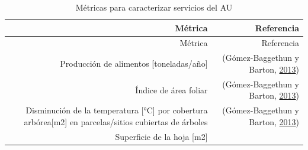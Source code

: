 \documentclass[12pt,a4paper,openany]{book}
\theoremstyle{definition}
\theoremstyle{definition}
\theoremstyle{definition}
\theoremstyle{remark}
\begin{document}
\begin{longtable}[]{@{}rr@{}}
\caption{\label{tab:ind-AU} Métricas para caracterizar servicios del
AU}\tabularnewline
\toprule
\begin{minipage}[b]{0.57\columnwidth}\raggedleft\strut
Métrica\strut
\end{minipage} & \begin{minipage}[b]{0.31\columnwidth}\raggedleft\strut
Referencia\strut
\end{minipage}\tabularnewline
\midrule
\endfirsthead
\toprule
\begin{minipage}[b]{0.57\columnwidth}\raggedleft\strut
Métrica\strut
\end{minipage} & \begin{minipage}[b]{0.31\columnwidth}\raggedleft\strut
Referencia\strut
\end{minipage}\tabularnewline
\midrule
\endhead
\begin{minipage}[t]{0.57\columnwidth}\raggedleft\strut
Producción de alimentos {[}toneladas/año{]}\strut
\end{minipage} & \begin{minipage}[t]{0.31\columnwidth}\raggedleft\strut
(Gómez-Baggethun y Barton,
\protect\hyperlink{ref-gomez-baggethun_classifying_2013}{2013})\strut
\end{minipage}\tabularnewline
\begin{minipage}[t]{0.57\columnwidth}\raggedleft\strut
Índice de área foliar\strut
\end{minipage} & \begin{minipage}[t]{0.31\columnwidth}\raggedleft\strut
(Gómez-Baggethun y Barton,
\protect\hyperlink{ref-gomez-baggethun_classifying_2013}{2013})\strut
\end{minipage}\tabularnewline
\begin{minipage}[t]{0.57\columnwidth}\raggedleft\strut
Disminución de la temperatura {[}°C{]} por cobertura arbórea{[}m2{]} en
parcelas/sitios cubiertas de árboles\strut
\end{minipage} & \begin{minipage}[t]{0.31\columnwidth}\raggedleft\strut
(Gómez-Baggethun y Barton,
\protect\hyperlink{ref-gomez-baggethun_classifying_2013}{2013})\strut
\end{minipage}\tabularnewline
\begin{minipage}[t]{0.57\columnwidth}\raggedleft\strut
Superficie de la hoja {[}m2{]}\strut
\end{minipage} & \begin{minipage}[t]{0.31\columnwidth}\raggedleft\strut

\end{minipage}
\end{longtable}
\end{document}
